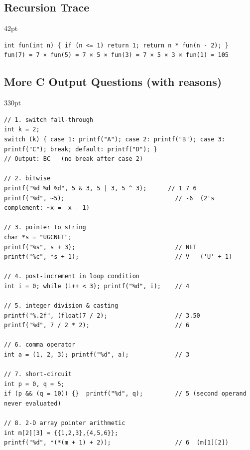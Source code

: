 \needspace{92pt}

\hypertarget{p2-03--72-recursion-trace}{%
\subsection{Recursion Trace}\label{p2-03--72-recursion-trace}}

\begin{listingblock}{42pt}
\begin{Verbatim}[fontsize=\fontsize{9.0}{10.9}\selectfont]
int fun(int n) { if (n <= 1) return 1; return n * fun(n - 2); }
fun(7) = 7 × fun(5) = 7 × 5 × fun(3) = 7 × 5 × 3 × fun(1) = 105
\end{Verbatim}
\end{listingblock}



\needspace{380pt}

\hypertarget{p2-03--73-more-c-output-questions-with-reasons}{%
\subsection{More C Output Questions (with reasons)}\label{p2-03--73-more-c-output-questions-with-reasons}}

\begin{listingblock}{330pt}
\begin{Verbatim}[fontsize=\fontsize{8.2}{10.0}\selectfont]
// 1. switch fall-through
int k = 2;
switch (k) { case 1: printf("A"); case 2: printf("B"); case 3: printf("C"); break; default: printf("D"); }
// Output: BC   (no break after case 2)

// 2. bitwise
printf("%d %d %d", 5 & 3, 5 | 3, 5 ^ 3);      // 1 7 6
printf("%d", ~5);                               // -6  (2's complement: ~x = -x - 1)

// 3. pointer to string
char *s = "UGCNET";
printf("%s", s + 3);                            // NET
printf("%c", *s + 1);                           // V   ('U' + 1)

// 4. post-increment in loop condition
int i = 0; while (i++ < 3); printf("%d", i);    // 4

// 5. integer division & casting
printf("%.2f", (float)7 / 2);                   // 3.50
printf("%d", 7 / 2 * 2);                        // 6

// 6. comma operator
int a = (1, 2, 3); printf("%d", a);             // 3

// 7. short-circuit
int p = 0, q = 5;
if (p && (q = 10)) {}  printf("%d", q);         // 5 (second operand never evaluated)

// 8. 2-D array pointer arithmetic
int m[2][3] = {{1,2,3},{4,5,6}};
printf("%d", *(*(m + 1) + 2));                  // 6  (m[1][2])
\end{Verbatim}
\end{listingblock}

